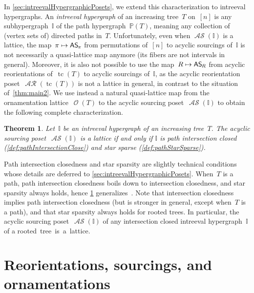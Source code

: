 \documentclass{amsart}
\newtheorem{theorem}{Theorem}[section]
\theoremstyle{definition}
\renewcommand{\c}[1]{\mathcal{#1}} %
\DeclareMathOperator{\tc}{tc} %
\newcommand{\darkblue}{\color{darkblue}} %
\newcommand{\defn}[1]{\textsl{\darkblue #1}} %
\newcommand{\mymap}[2]{\mathsf{#1}_{\hspace{-.7pt}#2}}
\DeclareMathOperator{\Orn}{\c{O}}  %
\DeclareMathOperator{\AReori}{\c{AR}}  %
\DeclareMathOperator{\ASour}{\mathcal{AS}}  %
\newcommand{\asour}[1]{\mymap{AS}{#1}}  %
\newcommand{\II}{\mathbb I} %
\newcommand{\PP}{\mathbb P} %
\begin{document}
In \cref{sec:intreevalHypergraphicPosets}, we extend this characterization to intreeval hypergraphs.
An \defn{intreeval hypergraph} of an increasing tree~$T$ on~$[n]$ is any subhypergraph~$\II$ of the path hypergraph~$\PP(T)$, meaning any collection of (vertex sets of) directed paths in~$T$.
Unfortunately, even when $\ASour(\II)$ is a lattice, the map~$\pi \mapsto \asour{\pi}$ from permutations of~$[n]$ to acyclic sourcings of~$\II$ is not necessarily a quasi-lattice map anymore (its fibers are not intervals in general).
Moreover, it is also not possible to use the map~$R \mapsto \asour{R}$ from acyclic reorientations of~$\tc(T)$ to acyclic sourcings of~$\II$, as the acyclic reorientation poset~$\AReori(\tc(T))$ is not a lattice in general, in contrast to the situation of~\cref{thm:main2}.
We use instead a natural quasi-lattice map from the ornamentation lattice~$\Orn(T)$ to the acyclic sourcing poset~$\ASour(\II)$ to obtain the following complete characterization.

\begin{theorem}
\label{thm:main3}
Let~$\II$ be an intreeval hypergraph of an increasing tree~$T$.
The acyclic sourcing poset~$\ASour(\II)$ is a lattice if and only if $\II$ is path intersection closed (\cref{def:pathIntersectionClose}) and star sparse (\cref{def:pathStarSparse}).
\end{theorem}

Path intersection closedness and star sparsity are slightly technical conditions whose details are deferred to \cref{sec:intreevalHypergraphicPosets}.
When~$T$ is a path, path intersection closedness boils down to intersection closedness, and star sparsity always holds, hence \cref{thm:main3} generalizes~\cite[Thm.~A]{BergeronPilaud}.
Note that intersection closedness implies path intersection closedness (but is stronger in general, except when~$T$ is a path), and that star sparsity always holds for rooted trees.
In particular, the acyclic sourcing poset~$\ASour(\II)$ of any intersection closed intreeval hypergraph~$\II$ of a rooted~tree~is~a~lattice.


\clearpage
\section{Reorientations, sourcings, and ornamentations}
\label{sec:general}
\end{document}
